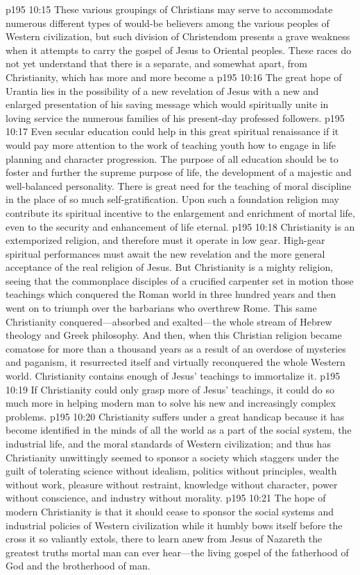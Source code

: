 \vs p195 10:15 These various groupings of Christians may serve to accommodate numerous different types of would\hyp{}be believers among the various peoples of Western civilization, but such division of Christendom presents a grave weakness when it attempts to carry the gospel of Jesus to Oriental peoples. These races do not yet understand that there is a  separate, and somewhat apart, from Christianity, which has more and more become a 
\vs p195 10:16 The great hope of Urantia lies in the possibility of a new revelation of Jesus with a new and enlarged presentation of his saving message which would spiritually unite in loving service the numerous families of his present\hyp{}day professed followers.
\vs p195 10:17 Even secular education could help in this great spiritual renaissance if it would pay more attention to the work of teaching youth how to engage in life planning and character progression. The purpose of all education should be to foster and further the supreme purpose of life, the development of a majestic and well\hyp{}balanced personality. There is great need for the teaching of moral discipline in the place of so much self\hyp{}gratification. Upon such a foundation religion may contribute its spiritual incentive to the enlargement and enrichment of mortal life, even to the security and enhancement of life eternal.
\vs p195 10:18 Christianity is an extemporized religion, and therefore must it operate in low gear. High\hyp{}gear spiritual performances must await the new revelation and the more general acceptance of the real religion of Jesus. But Christianity is a mighty religion, seeing that the commonplace disciples of a crucified carpenter set in motion those teachings which conquered the Roman world in three hundred years and then went on to triumph over the barbarians who overthrew Rome. This same Christianity conquered---absorbed and exalted---the whole stream of Hebrew theology and Greek philosophy. And then, when this Christian religion became comatose for more than a thousand years as a result of an overdose of mysteries and paganism, it resurrected itself and virtually reconquered the whole Western world. Christianity contains enough of Jesus’ teachings to immortalize it.
\vs p195 10:19 If Christianity could only grasp more of Jesus’ teachings, it could do so much more in helping modern man to solve his new and increasingly complex problems.
\vs p195 10:20 Christianity suffers under a great handicap because it has become identified in the minds of all the world as a part of the social system, the industrial life, and the moral standards of Western civilization; and thus has Christianity unwittingly seemed to sponsor a society which staggers under the guilt of tolerating science without idealism, politics without principles, wealth without work, pleasure without restraint, knowledge without character, power without conscience, and industry without morality.
\vs p195 10:21 The hope of modern Christianity is that it should cease to sponsor the social systems and industrial policies of Western civilization while it humbly bows itself before the cross it so valiantly extols, there to learn anew from Jesus of Nazareth the greatest truths mortal man can ever hear---the living gospel of the fatherhood of God and the brotherhood of man.
